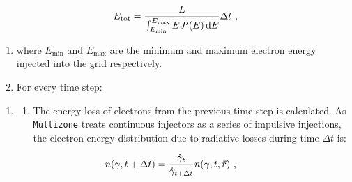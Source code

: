 \begin{equation}
    \begin{aligned}
        E_\text{tot}= \frac{L}{\int_{E_\text{min}}^{E_\text{max}}EJ'\qty(E)\dd{E}} \Delta t\text{ ,} 
    \end{aligned} \label{eq:09_multizone_total_energy_in_cells}
\end{equation}

\begin{enumerate}[label=\textbf{\arabic*}.]\setcounter{enumi}{\value{counter1}}
\item[] where $E_\text{min}$ and $E_\text{max}$ are the minimum and maximum electron energy injected into the grid respectively.
\item For every time step:
\setcounter{counter1}{\value{enumi}}
\end{enumerate}
\begin{enumerate}[label=\textbf{\arabic*}]\setcounter{enumi}{\value{counter1}}
	\item[]
\begin{enumerate}[label*=\textbf{\alph*}.]
    \itemsep0em
    \item The energy loss of electrons from the previous time step is calculated. As {\tt Multizone} treats continuous injectors as a series of impulsive injections, the electron energy distribution due to radiative losses during time $\Delta t$ is: \label{item:09_step_5a}
    \setcounter{counter2}{\value{enumii}}
\end{enumerate}
\end{enumerate}

\begin{equation}
    \begin{aligned}
    n\qty(\gamma,t+\Delta t) &=\frac{\dot{\gamma}_t}{\dot{\gamma}_{t+\Delta t}}n\qty(\gamma,t,\vec{r})\text{ ,} 
    \end{aligned}
\end{equation}

